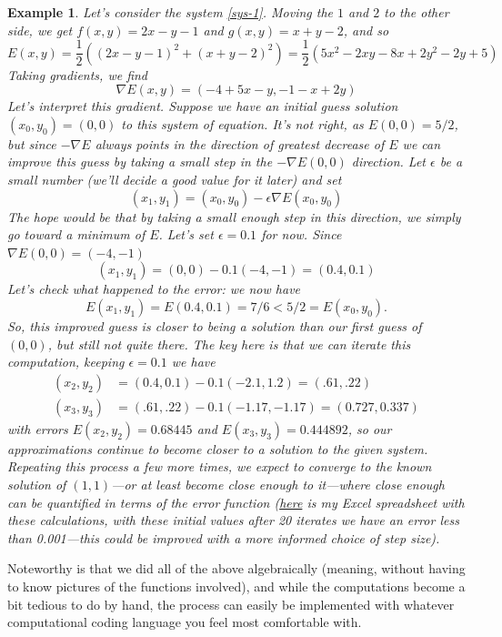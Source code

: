 \documentclass[12pt]{article}
\numberwithin{equation}{subsection}
\numberwithin{figure}{subsection}
\theoremstyle{note}
\newtheorem{example}[subsection]{Example}
\begin{document}
{\begin{example} \label{gd-ex}Let's consider the system \eqref{sys-1}. Moving the $1$ and $2$ to the other side, we get $f(x,y)=2x-y-1$ and $g(x,y)=x+y-2$, and so  \[ E(x,y)= \dfrac{1}{2} \left( (2x-y-1)^2 + (x+y-2)^2 \right)=\dfrac{1}{2} \left( 5 x^2 - 2x y - 8 x + 2y^2 - 2y + 5\right) \]
Taking gradients, we find \[ \nabla E(x,y) = \left( -4 + 5 x - y, -1 - x + 2 y\right)\]
Let's interpret this gradient. Suppose we have an initial guess solution $(x_0,y_0)=(0,0)$ to this system of equation. It's not right, as $E(0,0)=5/2$, but  since $-\nabla E$ always points in the direction of \textit{greatest decrease} of $E$ we can improve this guess by taking a small step in the $-\nabla E(0,0)$ direction. Let $\epsilon$ be a small number (we'll decide a good value for it later) and set \[ (x_1,y_1)=(x_0,y_0) - \epsilon \nabla E(x_0, y_0)\]  The hope would be that by taking a small enough step in this direction, we simply go toward a minimum of $E$. Let's set $\epsilon=0.1$ for now. Since $\nabla E(0,0)=(-4,-1)$ 
\[ (x_1,y_1)=(0,0)- 0.1 (-4,-1)=(0.4, 0.1)\]
Let's check what happened to the error: we now have \[E(x_1,y_1)=E(0.4, 0.1)=7/6<5/2=E(x_0,y_0).\] So, this improved guess is \textit{closer} to being a solution than our first guess of $(0,0)$, but still not quite there. The key here is that we can iterate this computation, keeping $\epsilon=0.1$ we have \begin{align*} (x_2,y_2) &= (0.4,0.1) - 0.1 (-2.1, 1.2)=(.61,.22) \\ 
(x_3,y_3) &= (.61,.22) -0.1 (-1.17, -1.17) = (0.727, 0.337)\end{align*}
with errors $E(x_2,y_2)= 0.68445$ and $E(x_3,y_3)=0.444892$, so our approximations continue to become closer to a solution to the given system. Repeating this process a few more times, we expect to converge to the known solution of $(1,1)$---or at least become \textit{close enough} to it---where close enough can be quantified in terms of the error function (\href{https://msoe.box.com/s/lkjin287s0ahd7dnecyb7t3pefqzrf0d}{here} is my Excel spreadsheet with these calculations, with these initial values after 20 iterates we have an error less than 0.001---this could be improved with a more informed choice of step size). 
\end{example}

Noteworthy is that we did all of the above algebraically (meaning, without having to know pictures of the functions involved), and while the computations become a bit tedious to do by hand, the process can easily be implemented with whatever computational coding language you feel most comfortable with.


}
\end{document}

